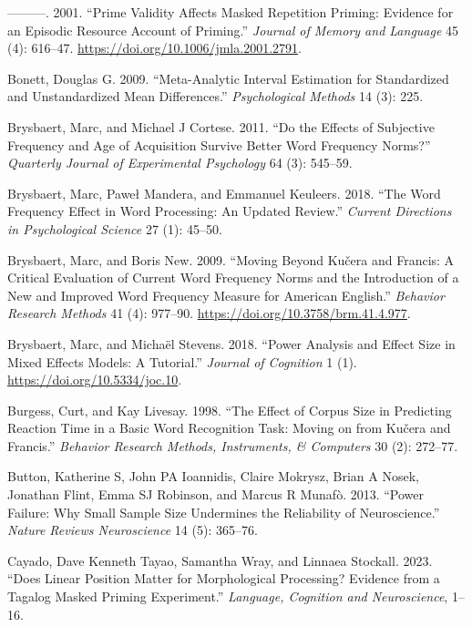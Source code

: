 \documentclass[
]{interact}
\newlength{\cslhangindent}
\newenvironment{CSLReferences}[2] %
 {\begin{list}{}{%
  \setlength{\itemindent}{0pt}
  \setlength{\leftmargin}{0pt}
  \setlength{\parsep}{0pt}
  \ifodd #1
   \setlength{\leftmargin}{\cslhangindent}
   \setlength{\itemindent}{-1\cslhangindent}
  \fi
  \setlength{\itemsep}{#2\baselineskip}}}
 {\end{list}}
\begin{document}
\begin{CSLReferences}{1}{0}
---------. 2001. {``Prime Validity Affects Masked Repetition Priming:
Evidence for an Episodic Resource Account of Priming.''} \emph{Journal
of Memory and Language} 45 (4): 616--47.
\url{https://doi.org/10.1006/jmla.2001.2791}.

Bonett, Douglas G. 2009. {``Meta-Analytic Interval Estimation for
Standardized and Unstandardized Mean Differences.''} \emph{Psychological
Methods} 14 (3): 225.

Brysbaert, Marc, and Michael J Cortese. 2011. {``Do the Effects of
Subjective Frequency and Age of Acquisition Survive Better Word
Frequency Norms?''} \emph{Quarterly Journal of Experimental Psychology}
64 (3): 545--59.

Brysbaert, Marc, Paweł Mandera, and Emmanuel Keuleers. 2018. {``The Word
Frequency Effect in Word Processing: An Updated Review.''} \emph{Current
Directions in Psychological Science} 27 (1): 45--50.

Brysbaert, Marc, and Boris New. 2009. {``Moving Beyond Ku{č}era and
Francis: A Critical Evaluation of Current Word Frequency Norms and the
Introduction of a New and Improved Word Frequency Measure for American
English.''} \emph{Behavior Research Methods} 41 (4): 977--90.
\url{https://doi.org/10.3758/brm.41.4.977}.

Brysbaert, Marc, and Michaël Stevens. 2018. {``Power Analysis and Effect
Size in Mixed Effects Models: A Tutorial.''} \emph{Journal of Cognition}
1 (1). \url{https://doi.org/10.5334/joc.10}.

Burgess, Curt, and Kay Livesay. 1998. {``The Effect of Corpus Size in
Predicting Reaction Time in a Basic Word Recognition Task: Moving on
from Ku{č}era and Francis.''} \emph{Behavior Research Methods,
Instruments, \& Computers} 30 (2): 272--77.

Button, Katherine S, John PA Ioannidis, Claire Mokrysz, Brian A Nosek,
Jonathan Flint, Emma SJ Robinson, and Marcus R Munafò. 2013. {``Power
Failure: Why Small Sample Size Undermines the Reliability of
Neuroscience.''} \emph{Nature Reviews Neuroscience} 14 (5): 365--76.

Cayado, Dave Kenneth Tayao, Samantha Wray, and Linnaea Stockall. 2023.
{``Does Linear Position Matter for Morphological Processing? Evidence
from a Tagalog Masked Priming Experiment.''} \emph{Language, Cognition
and Neuroscience}, 1--16.


\end{CSLReferences}
\end{document}
